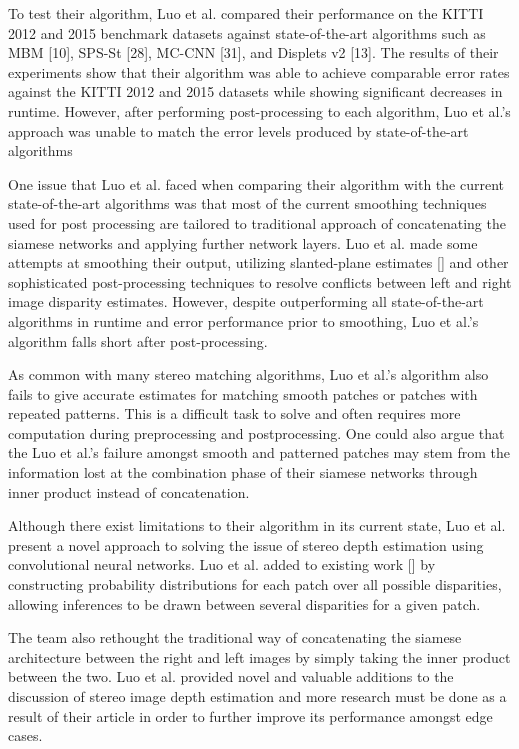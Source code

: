 \documentclass{article}
\begin{document}
To test their algorithm, Luo et al. compared their performance on the KITTI 2012 and 2015 benchmark datasets against state-of-the-art algorithms such as MBM [10], SPS-St [28], MC-CNN [31], and Displets v2 [13]. The results of their experiments show that their algorithm was able to achieve comparable error rates against the KITTI 2012 and 2015 datasets while showing significant decreases in runtime. However, after performing post-processing to each algorithm, Luo et al.’s approach was unable to match the error levels produced by state-of-the-art algorithms

One issue that Luo et al. \citep{luo2016efficient} faced when comparing their algorithm with the current state-of-the-art algorithms was that most of the current smoothing techniques used for post processing are tailored to traditional approach of concatenating the siamese networks and applying further network layers. Luo et al. made some attempts at smoothing their output, utilizing slanted-plane estimates [] and other sophisticated post-processing techniques to resolve conflicts between left and right image disparity estimates. However, despite outperforming all state-of-the-art algorithms in runtime and error performance prior to smoothing, Luo et al.’s algorithm falls short after post-processing.

As common with many stereo matching algorithms, Luo et al.’s algorithm \citep{luo2016efficient} also fails to give accurate estimates for matching smooth patches or patches with repeated patterns. This is a difficult task to solve and often requires more computation during preprocessing and postprocessing. One could also argue that the Luo et al.’s failure amongst smooth and patterned patches may stem from the information lost at the combination phase of their siamese networks through inner product instead of concatenation.

Although there exist limitations to their algorithm in its current state, Luo et al. \citep{luo2016efficient} present a novel approach to solving the issue of stereo depth estimation using convolutional neural networks. Luo et al. added to existing work [] by constructing probability distributions for each patch over all possible disparities, allowing inferences to be drawn between several disparities for a given patch.

The team also rethought the traditional way of concatenating the siamese architecture between the right and left images by simply taking the inner product between the two. Luo et al. \citep{luo2016efficient} provided novel and valuable additions to the discussion of stereo image depth estimation and more research must be done as a result of their article in order to further improve its performance amongst edge cases.
\end{document}
